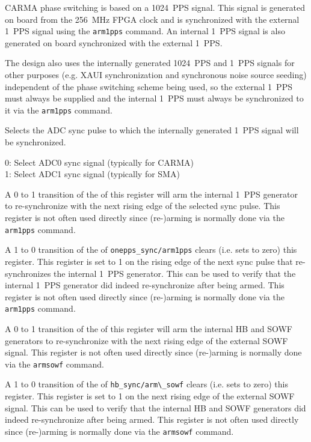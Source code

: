 \documentclass[12pt]{article}
\begin{document}
CARMA phase switching is based on a 1024~PPS signal.  This signal is generated
on board from the 256~MHz FPGA clock and is synchronized with the external
1~PPS signal using the \verb|arm1pps| command.  An internal 1~PPS signal is
also generated on board synchronized with the external 1~PPS.

The design also uses the internally generated 1024~PPS and 1~PPS signals for
other purposes (e.g. XAUI synchronization and synchronous noise source seeding)
independent of the phase switching scheme being used, so the external 1~PPS
must always be supplied and the internal 1~PPS must always be synchronized to
it via the \verb|arm1pps| command.


\begin{description}
 Selects the ADC sync pulse to which the internally generated
1~PPS signal will be synchronized.

0: Select ADC0 sync signal (typically for CARMA) \\
1: Select ADC1 sync signal (typically for SMA)

 A 0 to 1 transition of the \LSb of this register
will arm the internal 1~PPS generator to re-synchronize with the next rising
edge of the selected sync pulse.  This register is not often used directly
since (re-)arming is normally done via the \verb|arm1pps| command.

 A 1 to 0 transition of the \LSb of
\verb|onepps_sync/arm1pps| clears (i.e. sets to zero) this register.  This
register is set to 1 on the rising edge of the next sync pulse that
re-synchronizes the internal 1~PPS generator.  This can be used to verify that
the internal 1~PPS generator did indeed re-synchronize after being armed.  This
register is not often used directly since (re-)arming is normally done via the
\verb|arm1pps| command.

 A 0 to 1 transition of the \LSb of this register
will arm the internal HB and SOWF generators to re-synchronize with the next
rising edge of the external SOWF signal.  This register is not often used
directly since (re-)arming is normally done via the \verb|armsowf| command.

 A 1 to 0 transition of the \LSb of
\verb|hb_sync/arm\_sowf| clears (i.e. sets to zero) this register.  This
register is set to 1 on the next rising edge of the external SOWF signal.  This
can be used to verify that the internal HB and SOWF generators did indeed
re-synchronize after being armed.  This register is not often used directly
since (re-)arming is normally done via the \verb|armsowf| command.

\end{description}
\end{document}
